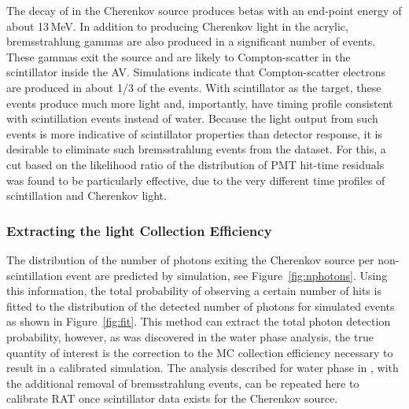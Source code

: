 The decay of \Li in the Cherenkov source produces betas with an end-point energy of about 13\,MeV. 
In addition to producing Cherenkov light in the acrylic, bremsstrahlung gammas are also produced in a significant number of events.  
These gammas exit the source and are likely to Compton-scatter in the scintillator inside the AV.  
Simulations indicate that Compton-scatter electrons are produced in about 1/3 of the events.  
With scintillator as the target, these events produce much more light and, importantly, have timing profile consistent with scintillation events instead of water.  
Because the light output from such events is more indicative of scintillator properties than detector response, it is desirable to eliminate such bremsstrahlung events from the dataset.
For this, a cut based on the likelihood ratio of the distribution of PMT hit-time residuals was found to be particularly effective, due to the very different time profiles of scintillation and Cherenkov light.

\subsubsection{Extracting the light Collection Efficiency}
The distribution of the number of photons exiting the Cherenkov source per non-scintillation event are predicted by simulation, see Figure~\ref{fig:nphotons}. 
Using this information, the total probability of observing a certain number of hits is fitted to the distribution of the detected number of photons for simulated events as shown in Figure~\ref{fig:fit}.
This method can extract the total photon detection probability, however, as was discovered in the water phase analysis, the true quantity of interest is the correction to the MC collection efficiency necessary to result in a calibrated simulation.
The analysis described for water phase in , with the additional removal of bremsstrahlung events, can be repeated here to calibrate RAT once scintillator data exists for the Cherenkov source.
